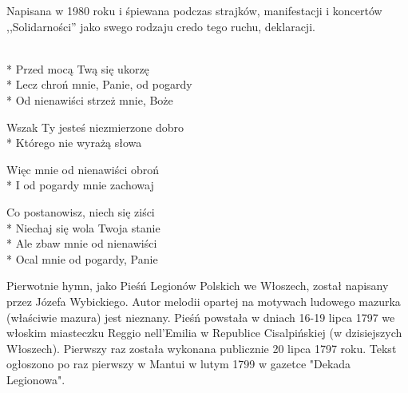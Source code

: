 \begin{info}Napisana w 1980 roku i śpiewana podczas strajków, manifestacji i koncertów ,,Solidarności'' jako swego rodzaju credo tego ruchu, deklaracji. \end{info}

\begin{lyrics}[longestline={Lecz chroń mnie, Panie, od pogardy}]

\\*
Przed mocą Twą się ukorzę\\*
Lecz chroń mnie, Panie, od pogardy\\*
Od nienawiści strzeż mnie, Boże

Wszak Ty jesteś niezmierzone dobro\\*
Którego nie wyrażą słowa

Więc mnie od nienawiści obroń\\*
I od pogardy mnie zachowaj

Co postanowisz, niech się ziści\\*
Niechaj się wola Twoja stanie\\*
Ale zbaw mnie od nienawiści\\*
Ocal mnie od pogardy, Panie
\end{lyrics}



\begin{info}Pierwotnie hymn, jako Pieśń Legionów Polskich we Włoszech, został napisany przez Józefa Wybickiego. Autor melodii opartej na motywach ludowego mazurka (właściwie mazura) jest nieznany. Pieśń powstała w dniach 16-19 lipca 1797 we włoskim miasteczku Reggio nell'Emilia w Republice Cisalpińskiej (w dzisiejszych Włoszech). Pierwszy raz została wykonana publicznie 20 lipca 1797 roku. Tekst ogłoszono po raz pierwszy w Mantui w lutym 1799 w gazetce "Dekada Legionowa".\end{info}

